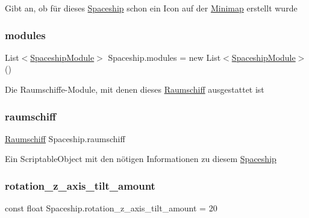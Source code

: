 Gibt an, ob für dieses \hyperlink{class_spaceship}{Spaceship} schon ein Icon auf der \hyperlink{class_minimap}{Minimap} erstellt wurde 

\mbox{\label{class_spaceship_aad3c0baa850f85ef7432c0ea6f0e003e}} 
\subsubsection{\texorpdfstring{modules}{modules}}
{\footnotesize\ttfamily List$<$\hyperlink{class_spaceship_module}{Spaceship\+Module}$>$ Spaceship.\+modules = new List$<$\hyperlink{class_spaceship_module}{Spaceship\+Module}$>$()}



Die Raumschiffe-\/\+Module, mit denen dieses \hyperlink{class_raumschiff}{Raumschiff} ausgestattet ist 

\mbox{\label{class_spaceship_a771d4dcd411d0d08d1c2a67fd6b5f5c1}} 
\subsubsection{\texorpdfstring{raumschiff}{raumschiff}}
{\footnotesize\ttfamily \hyperlink{class_raumschiff}{Raumschiff} Spaceship.\+raumschiff}



Ein Scriptable\+Object mit den nötigen Informationen zu diesem \hyperlink{class_spaceship}{Spaceship} 

\mbox{\label{class_spaceship_a1322e387e2296dbc3b47323f095d98fa}} 
\subsubsection{\texorpdfstring{rotation\+\_\+z\+\_\+axis\+\_\+tilt\+\_\+amount}{rotation\_z\_axis\_tilt\_amount}}
{\footnotesize\ttfamily const float Spaceship.\+rotation\+\_\+z\+\_\+axis\+\_\+tilt\+\_\+amount = 20}



